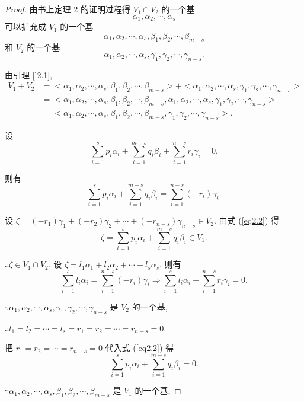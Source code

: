 \documentclass{ctexart}
\begin{document}
\begin{proof}
    由书上定理 2 的证明过程得 $V_1\cap V_2$ 的一个基
    \[\alpha_1,\alpha_2,\cdots,\alpha_s\]
    可以扩充成 $V_1$ 的一个基
    \[\alpha_1,\alpha_2,\cdots,\alpha_s,\beta_1,\beta_2,\cdots,\beta_{m-s}\]
    和 $V_2$ 的一个基
    \[\alpha_1,\alpha_2,\cdots,\alpha_s,\gamma_1,\gamma_2,\cdots,\gamma_{n-s}.\]

    由引理 \ref{l2.1},
    \begin{align*}
        V_1+V_2 & =<\alpha_1,\alpha_2,\cdots,\alpha_s,\beta_1,\beta_2,\cdots,\beta_{m-s}>+<\alpha_1,\alpha_2,\cdots,\alpha_s,\gamma_1,\gamma_2,\cdots,\gamma_{n-s}> \\
        & =<\alpha_1,\alpha_2,\cdots,\alpha_s,\beta_1,\beta_2,\cdots,\beta_{m-s},\alpha_1,\alpha_2,\cdots,\alpha_s,\gamma_1,\gamma_2,\cdots,\gamma_{n-s}> \\
        & =<\alpha_1,\alpha_2,\cdots,\alpha_s,\beta_1,\beta_2,\cdots,\beta_{m-s},\gamma_1,\gamma_2,\cdots,\gamma_{n-s}>.
    \end{align*}

    设
    \begin{equation}\label{eq2.2}
        \sum\limits_{i=1}^sp_i\alpha_i+\sum\limits_{i=1}^{m-s}q_i\beta_i+\sum\limits_{i=1}^{n-s}r_i\gamma_i=0.
    \end{equation}

    则有
    \[\sum\limits_{i=1}^sp_i\alpha_i+\sum\limits_{i=1}^{m-s}q_i\beta_i=\sum\limits_{i=1}^{n-s}(-r_i)\gamma_i.\]

    设 $\zeta=(-r_1)\gamma_1+(-r_2)\gamma_2+\cdots+(-r_{n-s})\gamma_{n-s}\in V_2$. 由式 (\ref{eq2.2}) 得
    \[\zeta=\sum\limits_{i=1}^sp_i\alpha_i+\sum\limits_{i=1}^{m-s}q_i\beta_i\in V_1.\]

    $\therefore\zeta\in V_1\cap V_2$. 设 $\zeta=l_1\alpha_1+l_2\alpha_2+\cdots+l_s\alpha_s$. 则有
    \[\sum\limits_{i=1}^sl_i\alpha_i=\sum\limits_{i=1}^{n-s}(-r_i)\gamma_i\Rightarrow\sum\limits_{i=1}^sl_i\alpha_i+\sum\limits_{i=1}^{n-s}r_i\gamma_i=0.\]

    $\because\alpha_1,\alpha_2,\cdots,\alpha_s,\gamma_1,\gamma_2,\cdots,\gamma_{n-s}$ 是 $V_2$ 的一个基,

    $\therefore l_1=l_2=\cdots=l_s=r_1=r_2=\cdots=r_{n-s}=0$.

    把 $r_1=r_2=\cdots=r_{n-s}=0$ 代入式 (\ref{eq2.2}) 得
    \[\sum\limits_{i=1}^sp_i\alpha_i+\sum\limits_{i=1}^{m-s}q_i\beta_i=0.\]

    $\because\alpha_1,\alpha_2,\cdots,\alpha_s,\beta_1,\beta_2,\cdots,\beta_{m-s}$ 是 $V_1$ 的一个基,


\end{proof}
\end{document}

